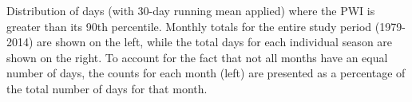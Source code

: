 \label{fig:annual_distribution}
Distribution of days (with 30-day running mean applied) where the PWI is greater than its 90th percentile. Monthly totals for the entire study period (1979-2014) are shown on the left, while the total days for each individual season are shown on the right. To account for the fact that not all months have an equal number of days, the counts for each month (left) are presented as a percentage of the total number of days for that month. 
